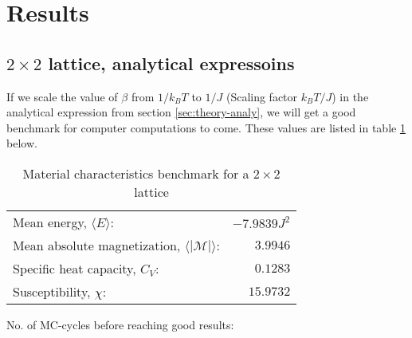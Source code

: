 \documentclass[../main.tex]{subfiles}
\begin{document}
\section{Results}
\subsection{$2 \times 2$ lattice, analytical expressoins}
If we scale the value of $\beta$ from $1/k_BT$ to $1/J$ (Scaling factor $k_B T/J$) in the analytical expression from section \ref{sec:theory-analy}, we will get a good benchmark for computer computations to come. These values are listed in table \ref{tab:2x2spinsEnergiesMags} below.
\begin{table}[!h]
\begin{center}
  \begin{tabular}{l r}
    Mean energy, $\langle E \rangle$: & $-7.9839J^2$  \\
    Mean absolute magnetization, $\langle |\mathcal{M}| \rangle$: & $3.9946$ \\
    Specific heat capacity, $C_V$: & $0.1283$\\
    Susceptibility, $\chi$: & $15.9732$
  \end{tabular}
  \caption{Material characteristics benchmark for a $2 \times 2$ lattice}
  \label{tab:2x2spinsEnergiesMags}
  No. of MC-cycles before reaching good results:
\end{center}
\end{table}
\FloatBarrier
\end{document}
